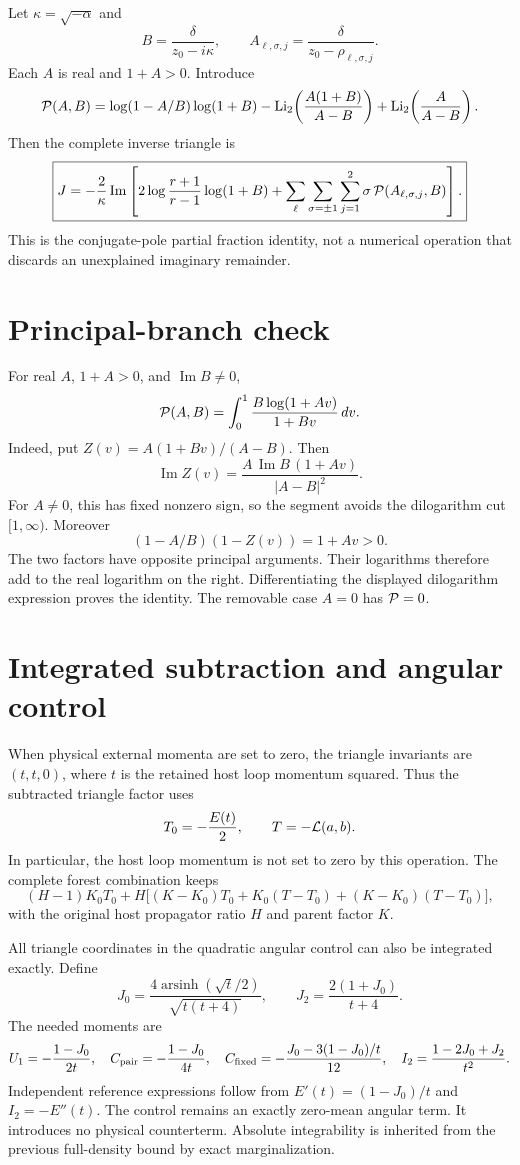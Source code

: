 \documentclass[11pt]{article}
\newcommand{\Li}{\operatorname{Li}_2}
\newcommand{\asinh}{\operatorname{arsinh}}
\begin{document}
Let \(\kappa=\sqrt{-\alpha}\) and
\[
 B=\frac{\delta}{z_0-i\kappa},\qquad
 A_{\ell,\sigma,j}=\frac{\delta}{z_0-\rho_{\ell,\sigma,j}}.
\]
Each \(A\) is real and \(1+A>0\). Introduce
\[
 {\cal P}(A,B)=
 \log(1-A/B)\log(1+B)
 -\Li\!\left(\frac{A(1+B)}{A-B}\right)
 +\Li\!\left(\frac{A}{A-B}\right).
\]
Then the complete inverse triangle is
\[
 \boxed{\displaystyle
 J=-\frac{2}{\kappa}\operatorname{Im}
 \left[
 2\log\frac{r+1}{r-1}\log(1+B)
 +\sum_{\ell}\sum_{\sigma=\pm1}\sum_{j=1}^2
       \sigma\,{\cal P}(A_{\ell,\sigma,j},B)
 \right].}
\]
This is the conjugate-pole partial fraction identity, not a numerical
operation that discards an unexplained imaginary remainder.

\section{Principal-branch check}
For real \(A\), \(1+A>0\), and \(\operatorname{Im}B\ne0\),
\[
 {\cal P}(A,B)=\int_0^1
 \frac{B\log(1+Av)}{1+Bv}\,dv.
\]
Indeed, put \(Z(v)=A(1+Bv)/(A-B)\). Then
\[
 \operatorname{Im}Z(v)=
 \frac{A\,\operatorname{Im}B\,(1+Av)}{|A-B|^2}.
\]
For \(A\ne0\), this has fixed nonzero sign, so the segment avoids the
dilogarithm cut \([1,\infty)\). Moreover
\[
 (1-A/B)(1-Z(v))=1+Av>0.
\]
The two factors have opposite principal arguments. Their logarithms
therefore add to the real logarithm on the right. Differentiating the
displayed dilogarithm expression proves the identity. The removable case
\(A=0\) has \({\cal P}=0\).

\section{Integrated subtraction and angular control}
When physical external momenta are set to zero, the triangle invariants
are \((t,t,0)\), where \(t\) is the retained host loop momentum squared.
Thus the subtracted triangle factor uses
\[
 T_0=-\frac{E(t)}2,\qquad T=-{\cal L}(a,b).
\]
In particular, the host loop momentum is not set to zero by this operation.
The complete forest combination keeps
\[
 (H-1)K_0T_0+
 H\bigl[(K-K_0)T_0+K_0(T-T_0)+(K-K_0)(T-T_0)\bigr],
\]
with the original host propagator ratio \(H\) and parent factor \(K\).

All triangle coordinates in the quadratic angular control can also be
integrated exactly. Define
\[
 J_0=\frac{4\asinh(\sqrt t/2)}{\sqrt{t(t+4)}},\qquad
 J_2=\frac{2(1+J_0)}{t+4}.
\]
The needed moments are
\[
 U_1=-\frac{1-J_0}{2t},\quad
 C_{\rm pair}=-\frac{1-J_0}{4t},\quad
 C_{\rm fixed}=-\frac{J_0-3(1-J_0)/t}{12},\quad
 I_2=\frac{1-2J_0+J_2}{t^2}.
\]
Independent reference expressions follow from
\(E'(t)=(1-J_0)/t\) and \(I_2=-E''(t)\).
The control remains an exactly zero-mean angular term. It introduces
no physical counterterm. Absolute integrability is inherited from the
previous full-density bound by exact marginalization.
\end{document}
